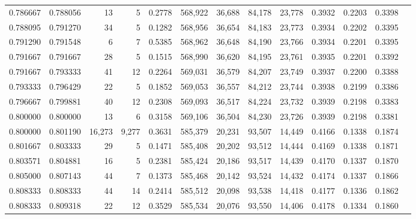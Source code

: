 \begin{tabular}{rrrrrrrrrrrrr}
0.786667 & 0.788056 &     13 &      5 &                                     0.2778 & 568,922 &  36,688 &  84,178 &  23,778 & 0.3932 & 0.2203 & 0.3398 \\
0.788095 & 0.791270 &     34 &      5 &                                     0.1282 & 568,956 &  36,654 &  84,183 &  23,773 & 0.3934 & 0.2202 & 0.3395 \\
0.791290 & 0.791548 &      6 &      7 &                                     0.5385 & 568,962 &  36,648 &  84,190 &  23,766 & 0.3934 & 0.2201 & 0.3395 \\
0.791667 & 0.791667 &     28 &      5 &                                     0.1515 & 568,990 &  36,620 &  84,195 &  23,761 & 0.3935 & 0.2201 & 0.3392 \\
0.791667 & 0.793333 &     41 &     12 &                                     0.2264 & 569,031 &  36,579 &  84,207 &  23,749 & 0.3937 & 0.2200 & 0.3388 \\
0.793333 & 0.796429 &     22 &      5 &                                     0.1852 & 569,053 &  36,557 &  84,212 &  23,744 & 0.3938 & 0.2199 & 0.3386 \\
0.796667 & 0.799881 &     40 &     12 &                                     0.2308 & 569,093 &  36,517 &  84,224 &  23,732 & 0.3939 & 0.2198 & 0.3383 \\
0.800000 & 0.800000 &     13 &      6 &                                     0.3158 & 569,106 &  36,504 &  84,230 &  23,726 & 0.3939 & 0.2198 & 0.3381 \\
0.800000 & 0.801190 & 16,273 &  9,277 &                                     0.3631 & 585,379 &  20,231 &  93,507 &  14,449 & 0.4166 & 0.1338 & 0.1874 \\
0.801667 & 0.803333 &     29 &      5 &                                     0.1471 & 585,408 &  20,202 &  93,512 &  14,444 & 0.4169 & 0.1338 & 0.1871 \\
0.803571 & 0.804881 &     16 &      5 &                                     0.2381 & 585,424 &  20,186 &  93,517 &  14,439 & 0.4170 & 0.1337 & 0.1870 \\
0.805000 & 0.807143 &     44 &      7 &                                     0.1373 & 585,468 &  20,142 &  93,524 &  14,432 & 0.4174 & 0.1337 & 0.1866 \\
0.808333 & 0.808333 &     44 &     14 &                                     0.2414 & 585,512 &  20,098 &  93,538 &  14,418 & 0.4177 & 0.1336 & 0.1862 \\
0.808333 & 0.809318 &     22 &     12 &                                     0.3529 & 585,534 &  20,076 &  93,550 &  14,406 & 0.4178 & 0.1334 & 0.1860 \\

\end{tabular}
